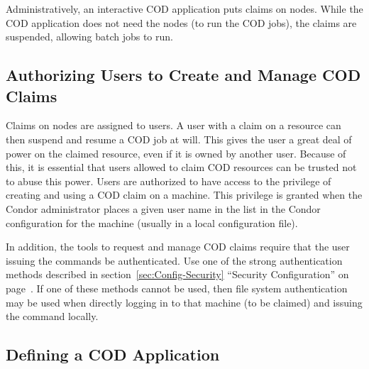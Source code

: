 Administratively,
an interactive COD application puts claims on nodes.
While the COD application does not need the nodes (to run the
COD jobs),  the claims are suspended, allowing batch jobs to run.


\subsection{\label{sec:cod-authorizing}
Authorizing Users to Create and Manage COD Claims}

Claims on nodes are assigned to users.
A user with a claim on a resource can then suspend and
resume a COD job at will.
This gives the user a great deal of power on the claimed resource,
even if it is owned by another user.
Because of this, it is essential that users allowed to claim
COD resources can be
trusted not to abuse this power.
Users are authorized to have access to the privilege
of creating and using a COD claim on a machine.
This privilege is granted when the Condor administrator places a given
user name in the  list in the Condor
configuration for the machine (usually in a local configuration file).

In addition, the tools to request and manage COD claims
require that the user issuing the commands be authenticated. 
Use one of the strong authentication methods described
in section~\ref{sec:Config-Security} ``Security Configuration'' on
page~\pageref{sec:Config-Security}.
If one of these methods cannot be used,
then file system authentication may be used
when directly logging in to that machine (to be claimed)
and issuing the command locally.


\subsection{\label{sec:cod-setup}
Defining a COD Application}

